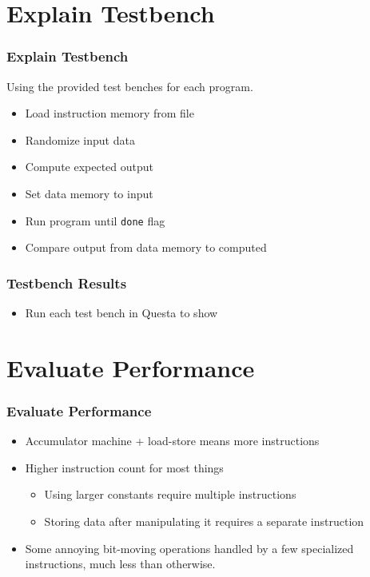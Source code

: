 	\section{Explain Testbench}

	\begin{frame}
		\frametitle{Explain Testbench}

		Using the provided test benches for each program.

		\begin{itemize}
			\item Load instruction memory from file
			\item Randomize input data
			\item Compute expected output
			\item Set data memory to input
			\item Run program until \texttt{done} flag
			\item Compare output from data memory to computed
		\end{itemize}
	\end{frame}

	\begin{frame}
		\frametitle{Testbench Results}

		\begin{itemize}
			\item Run each test bench in Questa to show
		\end{itemize}
	\end{frame}

	\section{Evaluate Performance}

	\begin{frame}
		\frametitle{Evaluate Performance}

		\begin{itemize}
			\item Accumulator machine + load-store means more instructions
			\item Higher instruction count for most things
				\begin{itemize}
					\item Using larger constants require multiple instructions
					\item Storing data after manipulating it requires a separate instruction
				\end{itemize}
			\item Some annoying bit-moving operations handled by a few specialized instructions, much less than otherwise.
		\end{itemize}
	\end{frame}


